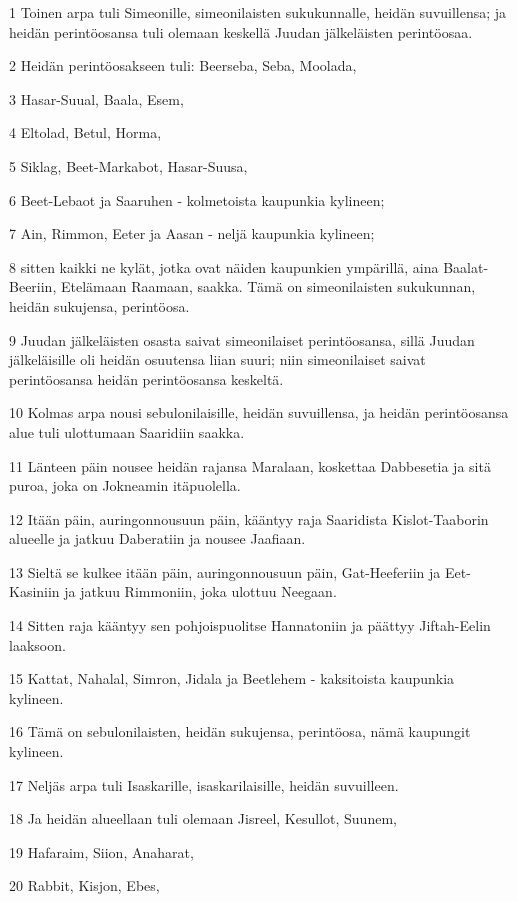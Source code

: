 \par 1 Toinen arpa tuli Simeonille, simeonilaisten sukukunnalle, heidän suvuillensa; ja heidän perintöosansa tuli olemaan keskellä Juudan jälkeläisten perintöosaa.
\par 2 Heidän perintöosakseen tuli: Beerseba, Seba, Moolada,
\par 3 Hasar-Suual, Baala, Esem,
\par 4 Eltolad, Betul, Horma,
\par 5 Siklag, Beet-Markabot, Hasar-Suusa,
\par 6 Beet-Lebaot ja Saaruhen - kolmetoista kaupunkia kylineen;
\par 7 Ain, Rimmon, Eeter ja Aasan - neljä kaupunkia kylineen;
\par 8 sitten kaikki ne kylät, jotka ovat näiden kaupunkien ympärillä, aina Baalat-Beeriin, Etelämaan Raamaan, saakka. Tämä on simeonilaisten sukukunnan, heidän sukujensa, perintöosa.
\par 9 Juudan jälkeläisten osasta saivat simeonilaiset perintöosansa, sillä Juudan jälkeläisille oli heidän osuutensa liian suuri; niin simeonilaiset saivat perintöosansa heidän perintöosansa keskeltä.
\par 10 Kolmas arpa nousi sebulonilaisille, heidän suvuillensa, ja heidän perintöosansa alue tuli ulottumaan Saaridiin saakka.
\par 11 Länteen päin nousee heidän rajansa Maralaan, koskettaa Dabbesetia ja sitä puroa, joka on Jokneamin itäpuolella.
\par 12 Itään päin, auringonnousuun päin, kääntyy raja Saaridista Kislot-Taaborin alueelle ja jatkuu Daberatiin ja nousee Jaafiaan.
\par 13 Sieltä se kulkee itään päin, auringonnousuun päin, Gat-Heeferiin ja Eet-Kasiniin ja jatkuu Rimmoniin, joka ulottuu Neegaan.
\par 14 Sitten raja kääntyy sen pohjoispuolitse Hannatoniin ja päättyy Jiftah-Eelin laaksoon.
\par 15 Kattat, Nahalal, Simron, Jidala ja Beetlehem - kaksitoista kaupunkia kylineen.
\par 16 Tämä on sebulonilaisten, heidän sukujensa, perintöosa, nämä kaupungit kylineen.
\par 17 Neljäs arpa tuli Isaskarille, isaskarilaisille, heidän suvuilleen.
\par 18 Ja heidän alueellaan tuli olemaan Jisreel, Kesullot, Suunem,
\par 19 Hafaraim, Siion, Anaharat,
\par 20 Rabbit, Kisjon, Ebes,
